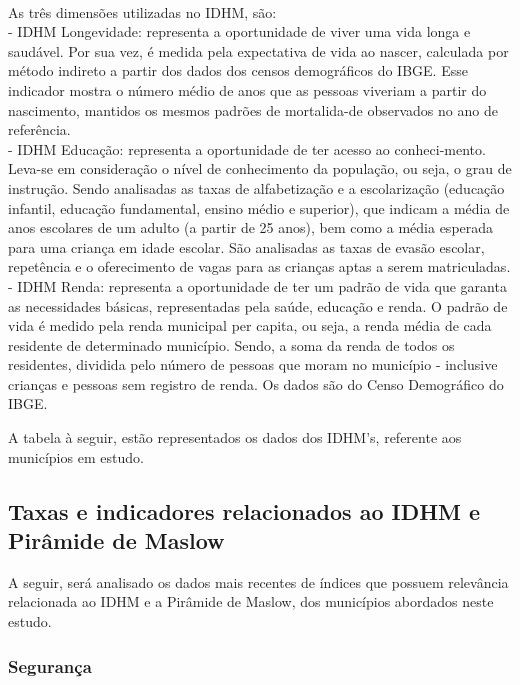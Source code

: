 \documentclass[a4paper, 10pt]{article}
\begin{document}
\\
As três dimensões utilizadas no  IDHM, são: 
\\
- IDHM Longevidade: representa a oportunidade de viver uma vida longa e saudável. Por sua vez, é medida pela expectativa de vida ao nascer, calculada por método indireto a partir dos dados dos censos demográficos do IBGE. Esse indicador mostra o número médio de anos que as pessoas viveriam a partir do nascimento, mantidos os mesmos padrões de mortalida-de observados no ano de referência.
\\
-  IDHM Educação: representa a oportunidade de ter acesso ao conheci-mento. Leva-se em consideração o nível de conhecimento da população, ou seja, o grau de instrução. Sendo analisadas as taxas de alfabetização e a escolarização (educação infantil, educação fundamental, ensino médio e superior), que indicam a média de anos escolares de um adulto (a partir de 25 anos), bem como a média esperada para uma criança em idade escolar. São analisadas as taxas de evasão escolar, repetência e o oferecimento de vagas para as crianças aptas a serem matriculadas.
\\
- IDHM Renda: representa a oportunidade de ter um padrão de vida que garanta as necessidades básicas, representadas pela saúde, educação e renda. O padrão de vida é medido pela renda municipal per capita, ou seja, a renda média de cada residente de determinado município. Sendo, a soma da renda de todos os residentes, dividida pelo número de pessoas que moram no município - inclusive crianças e pessoas sem registro de renda. Os dados são do Censo Demográfico do IBGE.
	
A tabela à seguir, estão representados os dados dos IDHM's, referente aos municípios em estudo.
   
  \subsection{Taxas e indicadores relacionados ao IDHM e Pirâmide de Maslow}
    
    A seguir, será analisado os dados mais recentes de índices que possuem relevância relacionada ao IDHM e a Pirâmide de Maslow, dos municípios abordados neste estudo.
    
    \subsubsection{Segurança}
    
\end{document}
